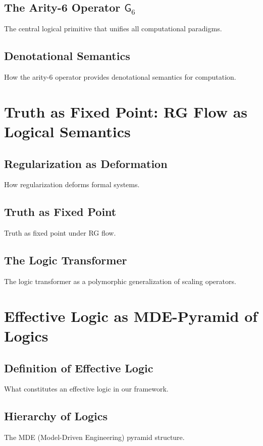 \documentclass[11pt,a4paper]{article}
\theoremstyle{definition}
\begin{document}
\subsection{The Arity-6 Operator $\mathsf{G}_6$}
The central logical primitive that unifies all computational paradigms.

\subsection{Denotational Semantics}
How the arity-6 operator provides denotational semantics for computation.

\section{Truth as Fixed Point: RG Flow as Logical Semantics}
\label{sec:truth-fixed-point}

\subsection{Regularization as Deformation}
How regularization deforms formal systems.

\subsection{Truth as Fixed Point}
Truth as fixed point under RG flow.

\subsection{The Logic Transformer}
The logic transformer as a polymorphic generalization of scaling operators.

\section{Effective Logic as MDE-Pyramid of Logics}
\label{sec:effective-logic}

\subsection{Definition of Effective Logic}
What constitutes an effective logic in our framework.

\subsection{Hierarchy of Logics}
The MDE (Model-Driven Engineering) pyramid structure.
\end{document}
